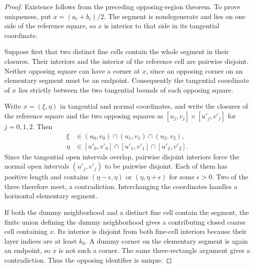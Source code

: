\begin{proof}\leanok
    Existence follows from the preceding opposing-region theorem.
    To prove uniqueness, put $x=(a_i+b_i)/2$. The segment is
    nondegenerate and lies on one side of the reference square, so
    $x$ is interior to that side in its tangential coordinate.

    Suppose first that two distinct fine cells contain the
    whole segment in their closures. Their interiors and the interior
    of the reference cell are pairwise disjoint. Neither opposing
    square can have a corner at $x$, since an opposing corner on an
    elementary segment must be an endpoint. Consequently the
    tangential coordinate of $x$ lies strictly between the two
    tangential bounds of each opposing square.

    Write $x=(\xi,\eta)$ in tangential and normal coordinates, and
    write the closures of the reference square and the two opposing
    squares as $[u_j,v_j]\times[u'_j,v'_j]$ for $j=0,1,2$. Then
    \begin{align}
        \xi  & \in(u_0,v_0)\cap(u_1,v_1)\cap(u_2,v_2),       \\
        \eta & \in[u'_0,v'_0]\cap[u'_1,v'_1]\cap[u'_2,v'_2].
    \end{align}
    Since the tangential open intervals overlap, pairwise disjoint
    interiors force the normal open intervals $(u'_j,v'_j)$ to be
    pairwise disjoint. Each of them has positive length and contains
    $(\eta-\epsilon,\eta)$ or $(\eta,\eta+\epsilon)$ for some
    $\epsilon>0$. Two of the three therefore meet, a contradiction.
    Interchanging the coordinates handles a horizontal elementary
    segment.

    If both the dummy neighborhood and a distinct fine cell
    contain the segment, the finite union defining the dummy
    neighborhood gives a contributing closed coarse cell
    containing $x$. Its interior is disjoint from both fine-cell
    interiors because their layer indices are at least $k_0$.
    A dummy corner on the elementary segment is again an endpoint,
    so $x$ is not such a corner. The same three-rectangle argument
    gives a contradiction. Thus the opposing identifier
    is unique.
\end{proof}
